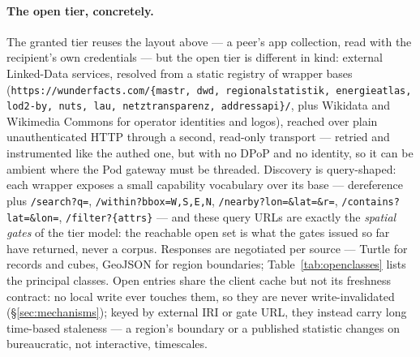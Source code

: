 \documentclass[11pt,a4paper]{article}
\theoremstyle{remark}
\newcommand{\code}[1]{\texttt{#1}}
\begin{document}
\paragraph{The open tier, concretely.} The granted tier reuses the layout
above --- a peer's app collection, read with the recipient's own credentials
--- but the open tier is different in kind: external Linked-Data services,
resolved from a static registry of wrapper bases
(\code{https://wunderfacts.com/\{mastr, dwd, regionalstatistik, energieatlas,
lod2-by, nuts, lau, netztransparenz, addressapi\}/}, plus Wikidata and
Wikimedia Commons for operator identities and logos), reached over plain
unauthenticated HTTP through a second, read-only transport --- retried and
instrumented like the authed one, but with no DPoP and no identity, so it can
be ambient where the Pod gateway must be threaded. Discovery is query-shaped:
each wrapper exposes a small capability vocabulary over its base ---
dereference plus \code{/search?q=}, \code{/within?bbox=W,S,E,N},
\code{/nearby?lon=\&lat=\&r=}, \code{/contains?lat=\&lon=},
\code{/filter?\{attrs\}} --- and these query URLs are exactly the
\emph{spatial gates} of the tier model: the reachable open set is what the
gates issued so far have returned, never a corpus. Responses are negotiated
per source --- Turtle for records and cubes, GeoJSON for region boundaries;
Table~\ref{tab:openclasses} lists the principal classes. Open entries share
the client cache but not its freshness contract: no local write ever touches
them, so they are never write-invalidated (\S\ref{sec:mechanisms});
keyed by external IRI or gate URL, they instead carry long time-based
staleness --- a region's boundary or a published statistic changes on
bureaucratic, not interactive, timescales.
\end{document}
